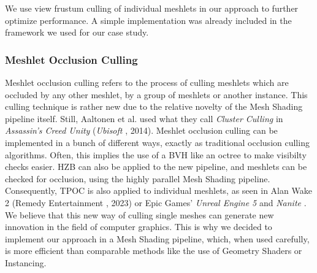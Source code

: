 \noindent
We use view frustum culling of individual meshlets in our approach to further optimize performance. A simple 
implementation was already included in the framework we used for our case study.


\subsubsection*{Meshlet Occlusion Culling} \label{subsubsec-meshlet-occlusion-culling}

Meshlet occlusion culling refers to the process of culling meshlets which are occluded by any other meshlet, by a 
group of meshlets or another instance. This culling technique is rather new due to the relative novelty of the 
Mesh Shading pipeline itself. Still, Aaltonen et al. \cite{Aaltonen2015} used what they call \emph{Cluster Culling} in 
\emph{Assassin's Creed Unity} (\emph{Ubisoft} \cite{Ubisoft2014}, 2014). Meshlet occlusion culling can be implemented in 
a bunch of different ways, exactly as traditional occlusion culling algorithms. Often, this implies the use of a 
\ac{BVH} like an octree to make visibilty checks easier. \ac{HZB} can also be applied to the new pipeline, and meshlets 
can be checked for occlusion, using the highly parallel Mesh Shading pipeline. Consequently, \ac{TPOC} is also applied 
to individual meshlets, as seen in Alan Wake 2 (Remedy Entertainment \cite{Remedy2023}, 2023) or Epic Games' 
\emph{Unreal Engine 5} and \emph{Nanite} \cite{Karis2021}.\\

\noindent
We believe that this new way of culling single meshes can generate new innovation in the field of computer graphics.
This is why we decided to implement our approach in a Mesh Shading pipeline, which, when used carefully, is more 
efficient than comparable methods like the use of Geometry Shaders or Instancing.